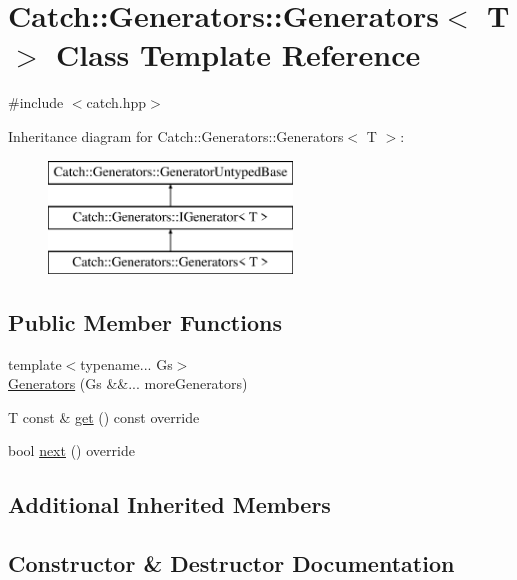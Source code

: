 \hypertarget{class_catch_1_1_generators_1_1_generators}{}\section{Catch\+:\+:Generators\+:\+:Generators$<$ T $>$ Class Template Reference}
\label{class_catch_1_1_generators_1_1_generators}


{\ttfamily \#include $<$catch.\+hpp$>$}

Inheritance diagram for Catch\+:\+:Generators\+:\+:Generators$<$ T $>$\+:\begin{figure}[H]
\begin{center}
\leavevmode
\includegraphics[height=3.000000cm]{class_catch_1_1_generators_1_1_generators}
\end{center}
\end{figure}
\subsection*{Public Member Functions}
\begin{DoxyCompactItemize}
\item 
{\footnotesize template$<$typename... Gs$>$ }\\\mbox{\hyperlink{class_catch_1_1_generators_1_1_generators_a2bcb50c42a8729cbac079b3b61699a61}{Generators}} (Gs \&\&... more\+Generators)
\item 
T const  \& \mbox{\hyperlink{class_catch_1_1_generators_1_1_generators_a66705482b7efa88cae6e6b7062d5de6a}{get}} () const override
\item 
bool \mbox{\hyperlink{class_catch_1_1_generators_1_1_generators_ad127fd2a07347b527f79ab3b78bd40fb}{next}} () override
\end{DoxyCompactItemize}
\subsection*{Additional Inherited Members}


\subsection{Constructor \& Destructor Documentation}
\mbox{\label{class_catch_1_1_generators_1_1_generators_a2bcb50c42a8729cbac079b3b61699a61}} 
